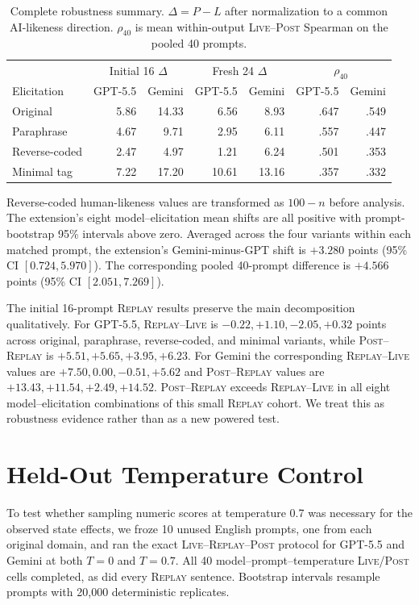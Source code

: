 \documentclass[10pt]{article}
\newcommand{\live}{\textsc{Live}}
\newcommand{\replay}{\textsc{Replay}}
\newcommand{\post}{\textsc{Post}}
\newcommand{\papersection}[1]{\Needspace{4.4\baselineskip}\section{#1}}
\begin{document}
\begin{table}[H]
\centering
\scriptsize
\setlength{\tabcolsep}{3.0pt}
\caption{Complete robustness summary. $\Delta=P-L$ after normalization to a common AI-likeness direction. $\rho_{40}$ is mean within-output \live{}--\post{} Spearman on the pooled 40 prompts.}
\label{tab:robustness-full}
\begin{tabular}{lrrrrrr}
\toprule
& \multicolumn{2}{c}{Initial 16 $\Delta$} & \multicolumn{2}{c}{Fresh 24 $\Delta$} & \multicolumn{2}{c}{$\rho_{40}$} \\
Elicitation & GPT-5.5 & Gemini & GPT-5.5 & Gemini & GPT-5.5 & Gemini \\
\midrule
Original & 5.86 & 14.33 & 6.56 & 8.93 & .647 & .549 \\
Paraphrase & 4.67 & 9.71 & 2.95 & 6.11 & .557 & .447 \\
Reverse-coded & 2.47 & 4.97 & 1.21 & 6.24 & .501 & .353 \\
Minimal tag & 7.22 & 17.20 & 10.61 & 13.16 & .357 & .332 \\
\bottomrule
\end{tabular}
\end{table}

Reverse-coded human-likeness values are transformed as $100-n$ before analysis. The extension's eight model--elicitation mean shifts are all positive with prompt-bootstrap 95\% intervals above zero. Averaged across the four variants within each matched prompt, the extension's Gemini-minus-GPT shift is $+3.280$ points (95\% CI $[0.724,5.970]$). The corresponding pooled 40-prompt difference is $+4.566$ points (95\% CI $[2.051,7.269]$).

The initial 16-prompt \replay{} results preserve the main decomposition qualitatively. For GPT-5.5, \replay{}--\live{} is $-0.22,+1.10,-2.05,+0.32$ points across original, paraphrase, reverse-coded, and minimal variants, while \post{}--\replay{} is $+5.51,+5.65,+3.95,+6.23$. For Gemini the corresponding \replay{}--\live{} values are $+7.50,0.00,-0.51,+5.62$ and \post{}--\replay{} values are $+13.43,+11.54,+2.49,+14.52$. \post{}--\replay{} exceeds \replay{}--\live{} in all eight model--elicitation combinations of this small \replay{} cohort. We treat this as robustness evidence rather than as a new powered test.

\papersection{Held-Out Temperature Control}
\label{app:temperature}
To test whether sampling numeric scores at temperature 0.7 was necessary for the observed state effects, we froze 10 unused English prompts, one from each original domain, and ran the exact \live{}--\replay{}--\post{} protocol for GPT-5.5 and Gemini at both $T=0$ and $T=0.7$. All 40 model--prompt--temperature \live{}/\post{} cells completed, as did every \replay{} sentence. Bootstrap intervals resample prompts with 20,000 deterministic replicates.
\end{document}
